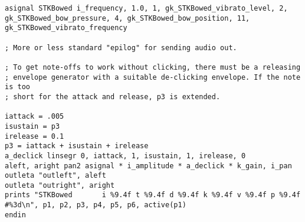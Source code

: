 \documentclass[12pt,letterpaper,onecolumn]{scrartcl}
\begin{document}
\begin{lstlisting}
asignal STKBowed i_frequency, 1.0, 1, gk_STKBowed_vibrato_level, 2, gk_STKBowed_bow_pressure, 4, gk_STKBowed_bow_position, 11, gk_STKBowed_vibrato_frequency

; More or less standard "epilog" for sending audio out.

; To get note-offs to work without clicking, there must be a releasing 
; envelope generator with a suitable de-clicking envelope. If the note is too 
; short for the attack and release, p3 is extended.

iattack = .005
isustain = p3
irelease = 0.1
p3 = iattack + isustain + irelease
a_declick linsegr 0, iattack, 1, isustain, 1, irelease, 0
aleft, aright pan2 asignal * i_amplitude * a_declick * k_gain, i_pan
outleta "outleft", aleft
outleta "outright", aright
prints "STKBowed       i %9.4f t %9.4f d %9.4f k %9.4f v %9.4f p %9.4f #%3d\n", p1, p2, p3, p4, p5, p6, active(p1)
endin

\end{lstlisting}
\end{document}
